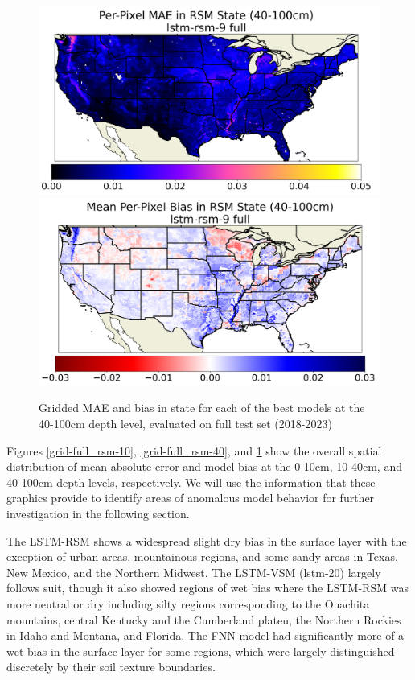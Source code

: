 \begin{figure}[hp!]
    \includegraphics[width=.48\linewidth,draft=false]{figures/grid-eval_best_full/eval-grid_full_lstm-rsm-9_rsm-100_spatial-stats_abs-err_state-err-abs-mean.png}
    \includegraphics[width=.48\linewidth,draft=false]{figures/grid-eval_best_full/eval-grid_full_lstm-rsm-9_rsm-100_spatial-stats_bias_state-err-bias-mean.png}

    \caption{Gridded MAE and bias in state for each of the best models at the 40-100cm depth level, evaluated on full test set (2018-2023)}
    \label{grid-full_rsm-100}
\end{figure}

Figures \ref{grid-full_rsm-10}, \ref{grid-full_rsm-40}, and \ref{grid-full_rsm-100} show the overall spatial distribution of mean absolute error and model bias at the 0-10cm, 10-40cm, and 40-100cm depth levels, respectively. We will use the information that these graphics provide to identify areas of anomalous model behavior for further investigation in the following section.

The LSTM-RSM shows a widespread slight dry bias in the surface layer with the exception of urban areas, mountainous regions, and some sandy areas in Texas, New Mexico, and the Northern Midwest. The LSTM-VSM (lstm-20) largely follows suit, though it also showed regions of wet bias where the LSTM-RSM was more neutral or dry including silty regions corresponding to the Ouachita mountains, central Kentucky and the Cumberland plateu, the Northern Rockies in Idaho and Montana, and Florida. The FNN model had significantly more of a wet bias in the surface layer for some regions, which were largely distinguished discretely by their soil texture boundaries.

